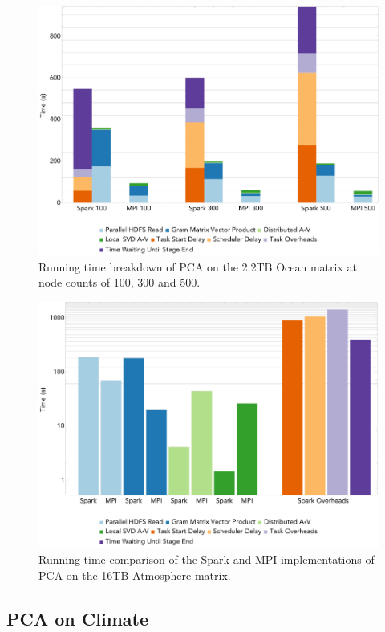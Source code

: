 \begin{figure}[th!]
\centering
\includegraphics[width=\textwidth]{fig/ocean_pca_times.png}
\caption{Running time breakdown of PCA on the 2.2TB Ocean matrix at node counts of 100, 300 and 500.}
\label{fig:pcart}
\end{figure}

\begin{figure}[th!]
\centering
\includegraphics[width=\textwidth]{fig/hero_pca_times.png}
\caption{Running time comparison of the Spark and MPI implementations of PCA on the 16TB Atmosphere matrix.}
\label{fig:hero}
\end{figure}

\subsection{PCA on Climate}

